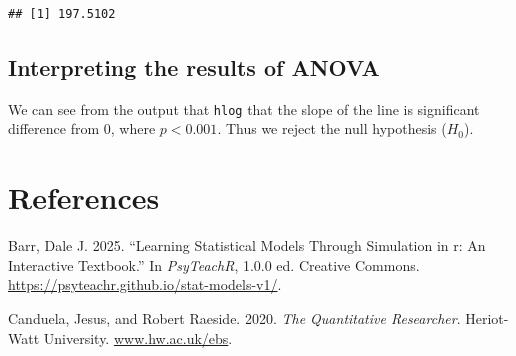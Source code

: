\documentclass[
]{article}
\newlength{\cslhangindent}
\newlength{\cslentryspacingunit} %
\newenvironment{CSLReferences}[2] %
 {%
  \setlength{\parindent}{0pt}
  \ifodd #1
  \let\oldpar\par
  \def\par{\hangindent=\cslhangindent\oldpar}
  \fi
  \setlength{\parskip}{#2\cslentryspacingunit}
 }%
 {}
\begin{document}
\begin{verbatim}
## [1] 197.5102
\end{verbatim}

\hypertarget{interpreting-the-results-of-anova}{%
\subsection{Interpreting the results of
ANOVA}\label{interpreting-the-results-of-anova}}

We can see from the output that \texttt{hlog} that the slope of the line
is significant difference from 0, where \(p < 0.001\). Thus we reject
the null hypothesis (\(H_{0}\)).

\hypertarget{references}{%
\section*{References}\label{references}}

\hypertarget{refs}{}
\begin{CSLReferences}{1}{0}
\leavevmode{}%
Barr, Dale J. 2025. {``Learning Statistical Models Through Simulation in
r: An Interactive Textbook.''} In \emph{PsyTeachR}, 1.0.0 ed. Creative
Commons. \url{https://psyteachr.github.io/stat-models-v1/}.

\leavevmode{}%
Canduela, Jesus, and Robert Raeside. 2020. \emph{The Quantitative
Researcher}. Heriot-Watt University.
\href{https://www.hw.ac.uk/ebs}{www.hw.ac.uk/ebs}.

\end{CSLReferences}
\end{document}
